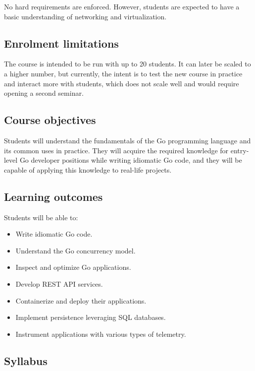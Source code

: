 \documentclass[
  digital,
  color,
  oneside,
  nosansbold,
  nocolorbold,
  lof,
  lot,
]{fithesis4}
\begin{document}
No hard requirements are enforced. However, students are expected to have a basic understanding of networking and virtualization.

\subsection{Enrolment limitations}

The course is intended to be run with up to 20 students. It can later be scaled to a higher number, but currently, the intent is to test the new course in practice and interact more with students, which does not scale well and would require opening a second seminar.

\subsection{Course objectives}

Students will understand the fundamentals of the Go programming language and its common uses in practice. They will acquire the required knowledge for entry-level Go developer positions while writing idiomatic Go code, and they will be capable of applying this knowledge to real-life projects.

\subsection{Learning outcomes}

Students will be able to:
\begin{itemize}
    \item Write idiomatic Go code.
    \item Understand the Go concurrency model.
    \item Inspect and optimize Go applications.
    \item Develop REST API services.
    \item Containerize and deploy their applications.
    \item Implement persistence leveraging SQL databases.
    \item Instrument applications with various types of telemetry.
\end{itemize}

\subsection{Syllabus}
\end{document}
